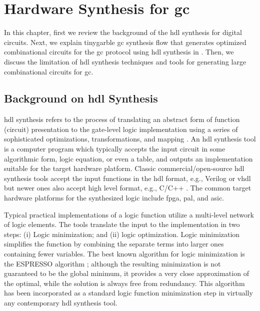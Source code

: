 \chapter{Hardware Synthesis for \acrshort{gc}}\label{chap:syn}
In this chapter, first we review the background of the \acrshort{hdl} synthesis for digital circuits.
Next, we explain \gls{tinygarble} \acrshort{gc} synthesis flow that generates optimized combinational circuits for the \acrshort{gc} protocol using \acrshort{hdl} synthesis in .
Then, we discuss the limitation of \acrshort{hdl} synthesis techniques and tools for generating large combinational circuits for \acrshort{gc}.

\section{Background on \acrshort{hdl} Synthesis}\label{sec:syn-back}
\acrshort{hdl} synthesis refers to the process of translating an abstract form of  function (circuit) presentation to the gate-level logic implementation using a series of sophisticated optimizations, transformations, and mapping \cite{sentovich1992sis,micheli1994synthesis,devadas1994logic,brayton1987mis}.
An \acrshort{hdl} synthesis tool is a computer program which typically accepts the input circuit in some algorithmic form, logic equation, or even a table, and outputs an implementation suitable for the target hardware platform.
Classic commercial/open-source \acrshort{hdl} synthesis tools accept the input functions in the \acrshort{hdl} format, e.g., Verilog or \acrshort{vhdl} \cite{tool:DesignCompiler,tool:ABC,tool:Encounter,tool:HDLdesigner,tool:PandA,decaluwe2004myhdl} but newer ones also accept high level format, e.g., C/C++ \cite{Gupta2004, tool:Vivado}.
The common target hardware platforms for the synthesized logic include \acrfull{fpga}, \acrfull{pal}, and \acrfull{asic}.

Typical practical implementations of a logic function utilize a multi-level network of logic elements.
The tools translate the input to the implementation in two steps: (i) Logic minimization; and (ii) logic optimization.
Logic minimization simplifies the function by combining the separate terms into larger ones containing fewer variables.
The best known algorithm for logic minimization is the ESPRESSO algorithm \cite{brayton1984logic}; although the resulting minimization is not guaranteed to be the global minimum, it provides a very close approximation of the optimal, while the solution is always free from redundancy.
This algorithm has been incorporated as a standard logic function minimization step in virtually any contemporary \acrshort{hdl} synthesis tool.

